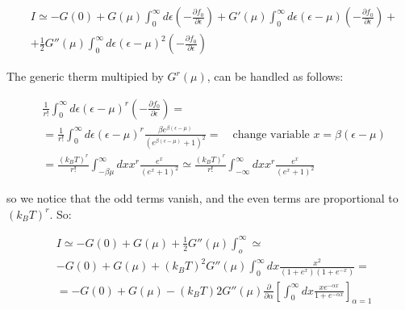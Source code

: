 \documentclass{article}
\begin{document}
\begin{equation}
    \begin{aligned}
         & I\simeq -G(0)+G(\mu)\int_0^\infty d\epsilon\left( -\frac{\partial f_0}{\partial \epsilon} \right) +G'(\mu)\int_0^\infty d\epsilon(\epsilon-\mu)\left( -\frac{\partial f_0}{\partial \epsilon} \right) + \\
         & + \frac{1}{2}G''(\mu)\int_0^\infty d\epsilon(\epsilon-\mu)^2\left( -\frac{\partial f_0}{\partial \epsilon} \right)
    \end{aligned}
\end{equation}

The generic therm multipied by $G^r(\mu)$, can be handled as follows:

\begin{equation}
    \begin{aligned}
         & \frac{1}{r!}\int_0^\infty d\epsilon(\epsilon-\mu)^r\left( -\frac{\partial f_0}{\partial \epsilon} \right)=                                                                      \\
         & = \frac{1}{r!}\int_0^\infty d\epsilon (\epsilon-\mu)^r\frac{\beta e^{\beta(\epsilon-\mu)}}{(e^{\beta(\epsilon-\mu)}+1)^2}= \quad \text{change variable $x=\beta(\epsilon-\mu)$} \\
         & = \frac{(k_BT)^r}{r!}\int_{-\beta\mu}^\infty dx x^r\frac{e^x}{(e^x+1)^2}\simeq \frac{(k_BT)^r}{r!}\int_{-\infty}^\infty dx x^r\frac{e^x}{(e^x+1)^2}
    \end{aligned}
\end{equation}

so we notice that the odd terms vanish, and the even terms are proportional to $(k_BT)^r$.
So:

\begin{equation}
    \begin{aligned}
         & I\simeq -G(0)+G(\mu)+\frac{1}{2}G''(\mu)\int_o^\infty \simeq                                                                                 \\
         & -G(0)+G(\mu)+(k_BT)^2G''(\mu)\int_0^\infty dx \frac{x^2}{(1+e^x)(1+e^{-x})}=                                                                 \\
         & =-G(0)+G(\mu)-(k_BT)2G''(\mu)\frac{\partial}{\partial \alpha}\left[\int_0^\infty dx \frac{xe^{-\alpha x}}{1+e^{-\alpha x}}\right]_{\alpha=1}
    \end{aligned}
\end{equation}
\end{document}
